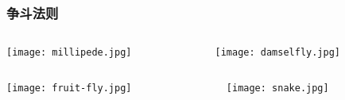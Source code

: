 \documentclass[UTF8,lualatex]{ctexbeamer}
\begin{document}

\begin{frame}
    \frametitle{争斗法则}
    \begin{columns}[t]
        \begin{column}{.48\textwidth}
            \begin{center}
                \texttt{[image: millipede.jpg]}
            \end{center}
        \end{column}
        \begin{column}{.48\textwidth}
            \begin{center}
                \texttt{[image: damselfly.jpg]}
            \end{center}
        \end{column}
    \end{columns}
    \begin{columns}[t]
        \begin{column}{.48\textwidth}
            \begin{center}
                \texttt{[image: fruit-fly.jpg]}
            \end{center}
        \end{column}
        \begin{column}{.48\textwidth}
            \begin{center}
                \texttt{[image: snake.jpg]}
            \end{center}
        \end{column}
    \end{columns}
\end{frame}

\end{document}
